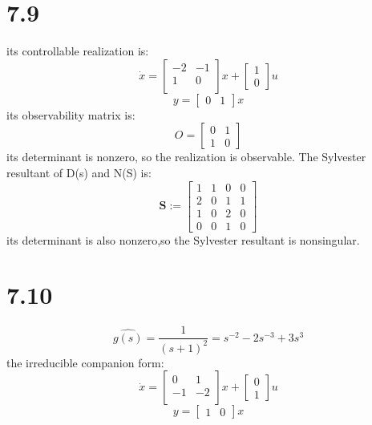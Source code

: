 \documentclass{article}
\begin{document}
\section*{7.9}
its controllable realization is:
\[
\dot{x}=
\left[
\begin{array}{cc}
-2 & -1\\
1 & 0\\
\end{array}    
\right]x+
\left[
    \begin{array}{c}
    1\\
    0
    \end{array}
\right]u
\]
\[
    y=\left[
        \begin{array}{cc}
            0 & 1
        \end{array}
        \right]x    
\]
its observability matrix is:
\[
    O=\left[
        \begin{array}{cc}
            0 & 1\\
            1 & 0
        \end{array}
    \right]      
\]
its determinant is nonzero, so the realization is observable.
The Sylvester resultant of D(s) and N(S) is:
\[
    \textbf{S}:=
    \left[
        \begin{array}{cccc}
            1 & 1 & 0 &0\\
            2 & 0 & 1 & 1\\
            1 & 0 &2 & 0\\
            0 & 0 & 1& 0
        \end{array}
    \right]
\]
its determinant is also nonzero,so the Sylvester resultant is nonsingular.

\section*{7.10}
\[
\hat{g(s)}=\frac{1}{(s+1)^2}=s^{-2}-2s^{-3}+3s^3
\]
the irreducible companion form:
\[
\dot{x}=
\left[
\begin{array}{cc}
0 & 1\\
-1 & -2\\
\end{array}    
\right]x+
\left[
    \begin{array}{c}
    0\\
    1
    \end{array}
\right]u
\]
\[
    y=\left[
        \begin{array}{cc}
            1 & 0
        \end{array}
        \right]x    
\]
\end{document}

